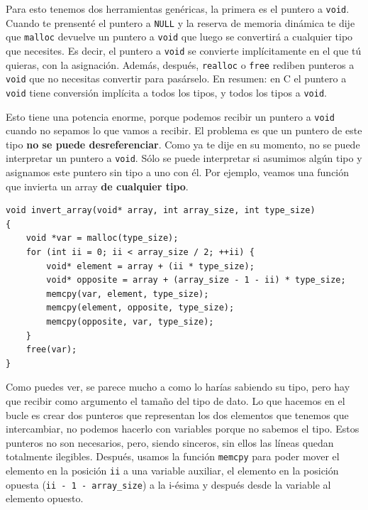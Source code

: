 \documentclass[a4paper]{article}
\begin{document}
Para esto tenemos dos herramientas genéricas, la primera es el puntero a
\verb!void!. Cuando te prensenté el puntero a \verb!NULL! y la reserva
de memoria dinámica te dije que \verb!malloc! devuelve un puntero a \verb.void.
que luego se convertirá a cualquier tipo que necesites. Es decir, el puntero
a \verb.void. se convierte implícitamente en el que tú quieras, con la
asignación. Además, después, \verb.realloc. o \verb.free. rediben punteros a
\verb.void. que no necesitas convertir para pasárselo. En resumen: en C el
puntero a \verb.void. tiene conversión implícita a todos los tipos, y todos
los tipos a \verb!void!.

Esto tiene una potencia enorme, porque podemos recibir un puntero a \verb"void"
cuando no sepamos lo que vamos a recibir. El problema es que un puntero de este
tipo \textbf{no se puede desreferenciar}. Como ya te dije en su momento,
no se puede interpretar un puntero a \verb!void!. Sólo se puede interpretar
si asumimos algún tipo y asignamos este puntero sin tipo a uno con él.
Por ejemplo, veamos una función que invierta un array
\textbf{de cualquier tipo}.

\noindent
\begin{minipage}[H]{\linewidth}
\mbox{}
\begin{lstlisting}[style=C,
caption={Inversión de arrays de cualquier tipo},
label={lst:genericArrayInversion}]
void invert_array(void* array, int array_size, int type_size)
{
    void *var = malloc(type_size);
    for (int ii = 0; ii < array_size / 2; ++ii) {
        void* element = array + (ii * type_size);
        void* opposite = array + (array_size - 1 - ii) * type_size;
        memcpy(var, element, type_size);
        memcpy(element, opposite, type_size);
        memcpy(opposite, var, type_size);
    }
    free(var);
}
\end{lstlisting}
\end{minipage}

Como puedes ver, se parece mucho a como lo harías sabiendo su tipo, pero hay
que recibir como argumento el tamaño del tipo de dato. Lo que hacemos en
el bucle es crear dos punteros que representan los dos elementos que tenemos
que intercambiar, no podemos hacerlo con variables porque no sabemos el tipo.
Estos punteros no son necesarios, pero, siendo sinceros, sin ellos las líneas
quedan totalmente ilegibles. Después, usamos la función \verb!memcpy! para poder
mover el elemento en la posición \verb!ii! a una variable auxiliar, el elemento
en la posición opuesta (\verb!ii - 1 - array_size!) a la i-ésima y después desde
la variable al elemento opuesto.
\end{document}
